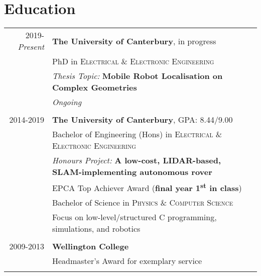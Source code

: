 \documentclass[a4paper,10pt]{article} %
\begin{document}

\section{Education}

\begin{tabular}{r|l}	

2019-\emph{Present} & \normalsize \textbf{The University of Canterbury}, in progress \\
& PhD in \textsc{Electrical \& Electronic Engineering} \\
& \quad \small\emph{Thesis Topic:} \textbf{Mobile Robot Localisation on Complex Geometries} \\
& \quad \small\emph{Ongoing} \\
\multicolumn{2}{c}{} \\

2014-2019 & \normalsize \textbf{The University of Canterbury}, \normalsize \textsc{GPA}: 8.44/9.00 \\
& Bachelor of Engineering (Hons) in \textsc{Electrical \& Electronic Engineering} \\
& \quad \small\emph{Honours Project:} \textbf{A low-cost, LIDAR-based, SLAM-implementing autonomous rover} \\
& \quad \small EPCA Top Achiever Award (\textbf{final year 1\textsuperscript{st} in class}) \\
& Bachelor of Science in \textsc{Physics \& Computer Science} \\
& \quad \small Focus on low-level/structured C programming, simulations, and robotics \\
\multicolumn{2}{c}{} \\

2009-2013 & \normalsize \textbf{Wellington College} \\
& \small Headmaster's Award for exemplary service \\
\multicolumn{2}{c}{} \\


\end{tabular}







\end{document}
